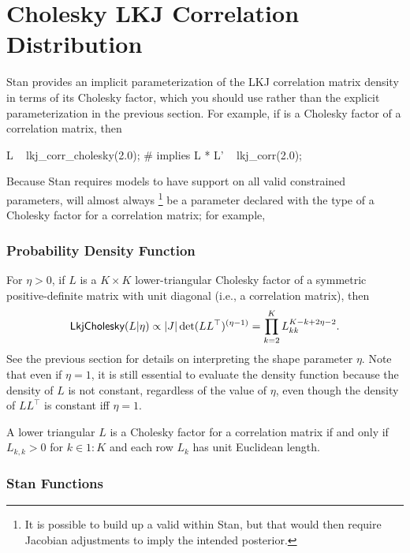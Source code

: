 \section{Cholesky LKJ Correlation Distribution}

Stan provides an implicit parameterization of the LKJ correlation matrix
density in terms of its Cholesky factor, which you should use rather
than the explicit parameterization in the previous section. For example,
if  is a Cholesky factor of a correlation matrix, then
%
\begin{stancode}
L ~ lkj_corr_cholesky(2.0);
# implies L * L' ~ lkj_corr(2.0);
\end{stancode}
%
Because Stan requires models to have support on all valid constrained
parameters,  will almost always
%
\footnote{It is possible to build up a valid  within Stan, but that
would then require Jacobian adjustments to imply the intended posterior.}
%
be a parameter declared with the type of a
Cholesky factor for a correlation matrix; for example,
%
\begin{stancode}
parameters {
  cholesky_factor_corr[K] L;
  # rather than corr_matrix[K] Sigma;
  // ...
\end{stancode}
%


\subsubsection{Probability Density Function}

For $\eta > 0$, if $L$ is a $K \times K$ lower-triangular Cholesky
factor of a symmetric positive-definite matrix with unit diagonal
(i.e., a correlation matrix), then
\[
\mbox{\sf LkjCholesky}(L|\eta)
\propto \left|J\right|\det(L L^\top)^{(\eta - 1)}
= \prod_{k=2}^K L_{kk}^{K-k+2\eta-2}.
\]
See the previous section for details on interpreting the shape
parameter $\eta$. Note that even if $\eta=1$, it is still essential to
evaluate the density function because the density of $L$ is not
constant, regardless of the value of $\eta$, even though the density of
$LL^\top$ is constant iff $\eta=1$.

A lower triangular $L$ is a Cholesky factor for a correlation matrix
if and only if $L_{k,k} > 0$ for $k \in 1{:}K$ and each row $L_k$ has
unit Euclidean length.


\subsubsection{Stan Functions}

